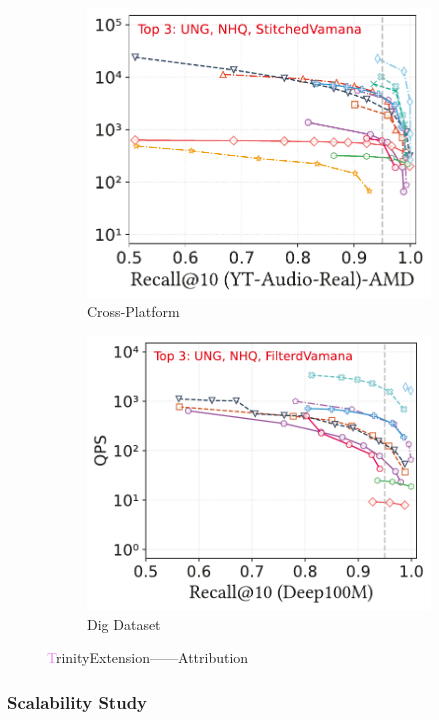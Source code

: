 \documentclass[sigconf, nonacm]{acmart}
\begin{document}
\begin{figure}[t]
\begin{subfigure}[b]{0.39\textwidth}
		\hfill
		\includegraphics[width=0.47\linewidth]{figures/exp/attribute_71.pdf}
		\caption{Cross-Platform}
		\label{fig:attribute-cross-platform}
	\end{subfigure}
	\hfill %
	\begin{subfigure}[b]{0.203\textwidth}
		\centering
		\includegraphics[width=0.96\linewidth]{figures/exp/attribute_100M.pdf} 
		\caption{Dig Dataset}
		\label{fig:attribute big dataset}
	\end{subfigure}
	
	\caption{\textcolor{violet}TrinityExtension——Attribution}
	\label{fig:TrinityExtension——Attribution_main}
\end{figure}
	
	\subsubsection{Scalability Study}
	
\end{document}
